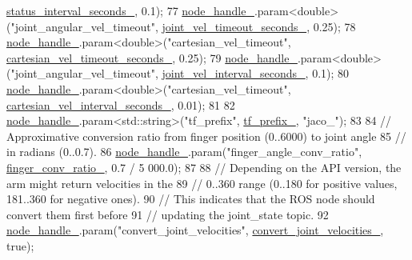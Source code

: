 \begin{DoxyCode}
      \hyperlink{classjaco_1_1JacoArm_aa44e18590ad8352a058df6abbd4a3c3b}{status\_interval\_seconds\_}, 0.1);
77     \hyperlink{classjaco_1_1JacoArm_aa8b6a99580f2ccf8a5c509cc0f3b3c8e}{node\_handle\_}.param<\textcolor{keywordtype}{double}>(\textcolor{stringliteral}{"joint\_angular\_vel\_timeout"}, 
      \hyperlink{classjaco_1_1JacoArm_ac27941dace9da942beeff70926cc736e}{joint\_vel\_timeout\_seconds\_}, 0.25);
78     \hyperlink{classjaco_1_1JacoArm_aa8b6a99580f2ccf8a5c509cc0f3b3c8e}{node\_handle\_}.param<\textcolor{keywordtype}{double}>(\textcolor{stringliteral}{"cartesian\_vel\_timeout"}, 
      \hyperlink{classjaco_1_1JacoArm_a822ad8d6fcc8719c5a090456998e832a}{cartesian\_vel\_timeout\_seconds\_}, 0.25);
79     \hyperlink{classjaco_1_1JacoArm_aa8b6a99580f2ccf8a5c509cc0f3b3c8e}{node\_handle\_}.param<\textcolor{keywordtype}{double}>(\textcolor{stringliteral}{"joint\_angular\_vel\_timeout"}, 
      \hyperlink{classjaco_1_1JacoArm_a832938e80c91ce57ec241a1429133926}{joint\_vel\_interval\_seconds\_}, 0.1);
80     \hyperlink{classjaco_1_1JacoArm_aa8b6a99580f2ccf8a5c509cc0f3b3c8e}{node\_handle\_}.param<\textcolor{keywordtype}{double}>(\textcolor{stringliteral}{"cartesian\_vel\_timeout"}, 
      \hyperlink{classjaco_1_1JacoArm_aa111ac63977d9a50b7e707b4a9e75e20}{cartesian\_vel\_interval\_seconds\_}, 0.01);
81 
82     \hyperlink{classjaco_1_1JacoArm_aa8b6a99580f2ccf8a5c509cc0f3b3c8e}{node\_handle\_}.param<std::string>(\textcolor{stringliteral}{"tf\_prefix"}, \hyperlink{classjaco_1_1JacoArm_a4f7d75d1cfcf82b4221e6bd6e4412cf9}{tf\_prefix\_}, \textcolor{stringliteral}{"jaco\_"});
83 
84     \textcolor{comment}{// Approximative conversion ratio from finger position (0..6000) to joint angle }
85     \textcolor{comment}{// in radians (0..0.7).}
86     \hyperlink{classjaco_1_1JacoArm_aa8b6a99580f2ccf8a5c509cc0f3b3c8e}{node\_handle\_}.param(\textcolor{stringliteral}{"finger\_angle\_conv\_ratio"}, \hyperlink{classjaco_1_1JacoArm_a45f8b1fbeec4d1abfcad6d3f9e65b6ca}{finger\_conv\_ratio\_}, 0.7 / 5
      000.0);
87 
88     \textcolor{comment}{// Depending on the API version, the arm might return velocities in the}
89     \textcolor{comment}{// 0..360 range (0..180 for positive values, 181..360 for negative ones).}
90     \textcolor{comment}{// This indicates that the ROS node should convert them first before}
91     \textcolor{comment}{// updating the joint\_state topic.}
92     \hyperlink{classjaco_1_1JacoArm_aa8b6a99580f2ccf8a5c509cc0f3b3c8e}{node\_handle\_}.param(\textcolor{stringliteral}{"convert\_joint\_velocities"}, 
      \hyperlink{classjaco_1_1JacoArm_a20deb1358ca2385fcf9dca3f0f771409}{convert\_joint\_velocities\_}, \textcolor{keyword}{true});

\end{DoxyCode}
